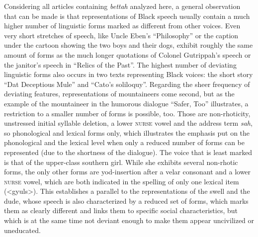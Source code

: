 Considering all articles containing \emph{bettah} analyzed here, a general observation that can be made is that representations of Black speech usually contain a much higher number of linguistic forms marked as different from other voices. Even very short stretches of speech, like Uncle Eben’s “Philosophy” or the caption under the cartoon showing the two boys and their dogs, exhibit roughly the same amount of forms as the much longer quotations of Colonel Gutrippah’s speech or the janitor’s speech in “Relics of the Past”. The highest number of deviating linguistic forms also occurs in two texts representing Black voices: the short story “Dat Deceptious Mule” and “Cato’s soliloquy”. Regarding the sheer frequency of deviating features, representations of mountaineers come second, but as the example of the mountaineer in the humorous dialogue “Safer, Too” illustrates, a restriction to a smaller number of forms is possible, too. Those are non-rhoticity, unstressed initial syllable deletion, a lower \textsc{nurse} vowel and the address term \emph{sah}, so phonological and lexical forms only, which illustrates the emphasis put on the phonological and the lexical level when only a reduced number of forms can be represented (due to the shortness of the dialogue). The voice that is least marked is that of the upper-class southern girl. While she exhibits several non-rhotic forms, the only other forms are yod-insertion after a velar consonant and a lower \textsc{nurse} vowel, which are both indicated in the spelling of only one lexical item (<gyuls>). This establishes a parallel to the representations of the swell and the dude, whose speech is also characterized by a reduced set of forms, which marks them as clearly different and links them to specific social characteristics, but which is at the same time not deviant enough to make them appear uncivilized or uneducated.

